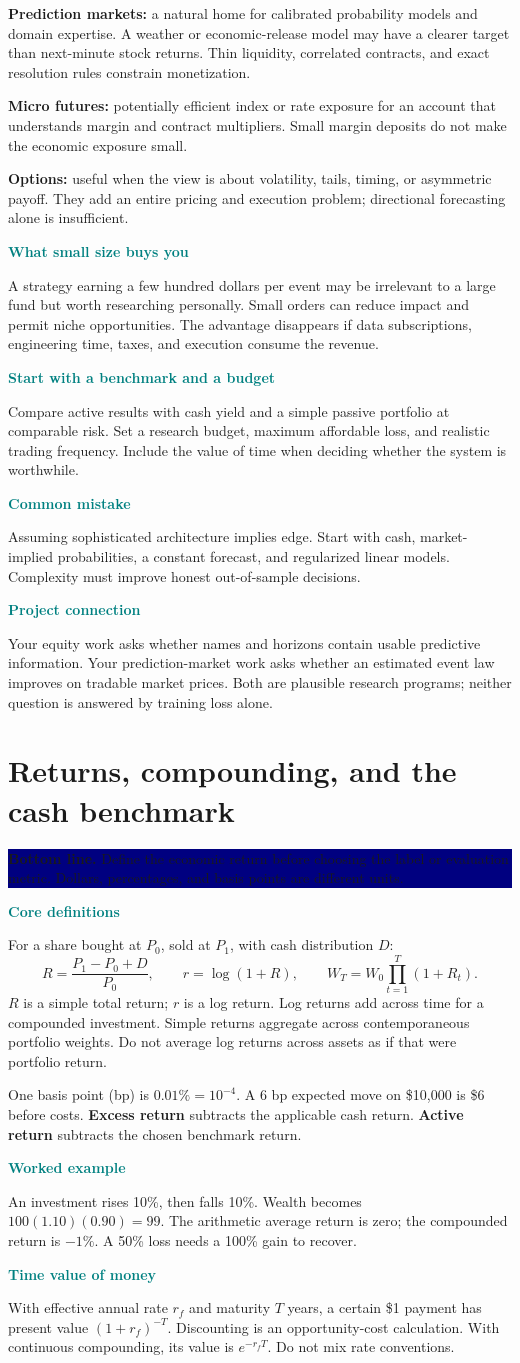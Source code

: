 \documentclass[10pt,letterpaper]{article}
\newcommand{\bl}[1]{\noindent\colorbox{navy}{\parbox{\dimexpr\linewidth-2\fboxsep}{\color{white}\textbf{Bottom line.} #1}}\par\medskip}
\newcommand{\topic}[2]{\clearpage\section{#1}\bl{#2}}
\newcommand{\sub}[1]{\par\textbf{\textcolor{teal}{#1}}\par}
\newcommand{\ex}[1]{\sub{Worked example}#1}
\newcommand{\pit}[1]{\sub{Common mistake}#1}
\begin{document}
\textbf{Prediction markets:} a natural home for calibrated probability models and domain expertise. A weather or economic-release model may have a clearer target than next-minute stock returns. Thin liquidity, correlated contracts, and exact resolution rules constrain monetization.

\textbf{Micro futures:} potentially efficient index or rate exposure for an account that understands margin and contract multipliers. Small margin deposits do not make the economic exposure small.

\textbf{Options:} useful when the view is about volatility, tails, timing, or asymmetric payoff. They add an entire pricing and execution problem; directional forecasting alone is insufficient.
\sub{What small size buys you}
A strategy earning a few hundred dollars per event may be irrelevant to a large fund but worth researching personally. Small orders can reduce impact and permit niche opportunities. The advantage disappears if data subscriptions, engineering time, taxes, and execution consume the revenue.
\sub{Start with a benchmark and a budget}
Compare active results with cash yield and a simple passive portfolio at comparable risk. Set a research budget, maximum affordable loss, and realistic trading frequency. Include the value of time when deciding whether the system is worthwhile.
\pit{Assuming sophisticated architecture implies edge. Start with cash, market-implied probabilities, a constant forecast, and regularized linear models. Complexity must improve honest out-of-sample decisions.}
\sub{Project connection}
Your equity work asks whether names and horizons contain usable predictive information. Your prediction-market work asks whether an estimated event law improves on tradable market prices. Both are plausible research programs; neither question is answered by training loss alone.
\topic{Returns, compounding, and the cash benchmark}{Define the economic return before choosing the label or evaluation metric. Dollars, percentages, and basis points are different units.}
\sub{Core definitions}
For a share bought at $P_0$, sold at $P_1$, with cash distribution $D$:
\[R=\frac{P_1-P_0+D}{P_0},\qquad r=\log(1+R),\qquad W_T=W_0\prod_{t=1}^T(1+R_t).\]
$R$ is a simple total return; $r$ is a log return. Log returns add across time for a compounded investment. Simple returns aggregate across contemporaneous portfolio weights. Do not average log returns across assets as if that were portfolio return.

One basis point (bp) is $0.01\%=10^{-4}$. A 6 bp expected move on \$10,000 is \$6 before costs. \textbf{Excess return} subtracts the applicable cash return. \textbf{Active return} subtracts the chosen benchmark return.
\ex{An investment rises 10\%, then falls 10\%. Wealth becomes $100(1.10)(0.90)=99$. The arithmetic average return is zero; the compounded return is $-1\%$. A 50\% loss needs a 100\% gain to recover.}
\sub{Time value of money}
With effective annual rate $r_f$ and maturity $T$ years, a certain \$1 payment has present value $(1+r_f)^{-T}$. Discounting is an opportunity-cost calculation. With continuous compounding, its value is $e^{-r_fT}$. Do not mix rate conventions.
\end{document}
